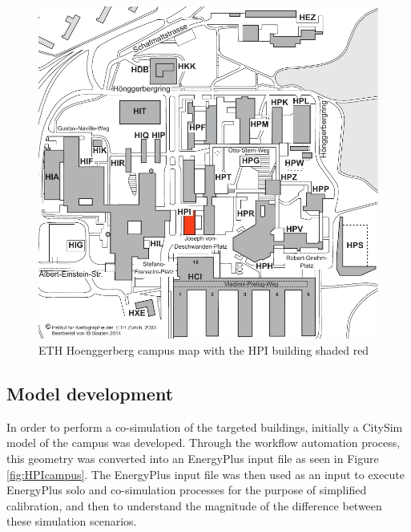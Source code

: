 \documentclass{tBPS2e}
\theoremstyle{plain}
\theoremstyle{definition}
\theoremstyle{remark}
\begin{document}
\begin{figure}[H]
\centering
\includegraphics[scale=0.5]{figures/ETH_Hoenngerbergcamp_targetedbuildings_HPI}
\caption{ETH Hoenggerberg campus map with the HPI building shaded red}
\label{fig:campusmap}
\end{figure}

\subsection{Model development}
In order to perform a co-simulation of the targeted buildings, initially a
CitySim model of the campus was developed. Through the workflow automation
process, this geometry was converted into an EnergyPlus input file as seen in
Figure \ref{fig:HPIcampus}. The EnergyPlus input file was then used as an input
to execute EnergyPlus solo and co-simulation processes for the purpose of
simplified calibration, and then to understand the magnitude of the difference
between these simulation scenarios.
\end{document}
